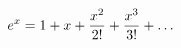 \documentclass[preview]{standalone}
\begin{document}
\begin{align*}
e^x = 1 + x + {x^2 \over 2!} + {x^3 \over 3!} + \dots
\end{align*}
\end{document}
